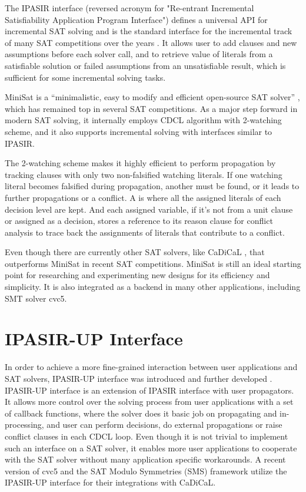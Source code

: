 The IPASIR interface (reversed acronym for "Re-entrant Incremental Satisfiability Application Program Interface") defines a universal API for incremental SAT solving and is the standard interface for the incremental track of many SAT competitions over the years \cite{BALYO201645}. It allows user to add clauses and new assumptions before each solver call, and to retrieve value of literals from a satisfiable solution or failed assumptions from an unsatisfiable result, which is sufficient for some incremental solving tasks.

MiniSat is a ``minimalistic, easy to modify and efficient open-source SAT solver'' \cite{10.1007/978-3-540-24605-3_37}, which has remained top in several SAT competitions. As a major step forward in modern SAT solving, it internally employs CDCL algorithm with 2-watching scheme, and it also supports incremental solving with interfaces similar to IPASIR.

The 2-watching scheme makes it highly efficient to perform propagation by tracking clauses with only two non-falsified watching literals. If one watching literal becomes falsified during propagation, another must be found, or it leads to further propagations or a conflict. A  is where all the assigned literals of each decision level are kept. And each assigned variable, if it's not from a unit clause or assigned as a decision, stores a reference to its reason clause for conflict analysis to trace back the assignments of literals that contribute to a conflict.

Even though there are currently other SAT solvers, like CaDiCaL \cite{BiereFallerFazekasFleuryFroleyks-CAV24}, that outperforms MiniSat in recent SAT competitions. MiniSat is still an ideal starting point for researching and experimenting new designs for its efficiency and simplicity. It is also integrated as a backend in many other applications, including SMT solver cvc5.

\section{IPASIR-UP Interface}

In order to achieve a more fine-grained interaction between user applications and SAT solvers, IPASIR-UP interface was introduced \cite{fazekas_et_al:LIPIcs.SAT.2023.8} and further developed \cite{FazekasNiemetzPreinerKirchwegerSzeiderBiere-JAIR24}. IPASIR-UP interface is an extension of IPASIR interface with user propagators. It allows more control over the solving process from user applications with a set of callback functions, where the solver does it basic job on propagating and in-processing, and user can perform decisions, do external propagations or raise conflict clauses in each CDCL loop. Even though it is not trivial to implement such an interface on a SAT solver, it enables more user applications to cooperate with the SAT solver without many application specific workarounds. A recent version of cvc5 and the SAT Modulo Symmetries (SMS) framework utilize the IPASIR-UP interface for their integrations with CaDiCaL.


